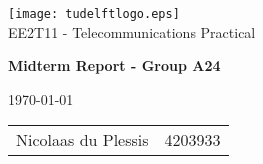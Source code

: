 \noindent
\begin{center}
	\texttt{[image: tudelftlogo.eps]} \\
	
	\large{EE2T11 - Telecommunications Practical}\\
	\begin{LARGE}
		\textbf{Midterm Report - Group A24} \\[0.3cm]
	\end{LARGE}
	\today \\[.2cm]
	\begin{tabular}{l l} \\
		Nicolaas du Plessis & 4203933 \\
		
	\end{tabular}
\end{center}

\newpage